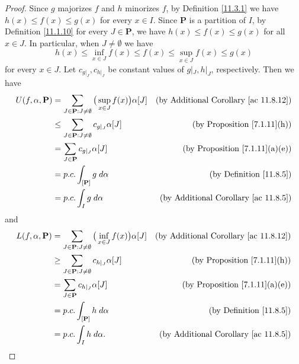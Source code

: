 \begin{proof}
    Since \(g\) majorizes \(f\) and \(h\) minorizes \(f\), by Definition \ref{11.3.1} we have \(h(x) \leq f(x) \leq g(x)\) for every \(x \in I\).
    Since \(\mathbf{P}\) is a partition of \(I\), by Definition \ref{11.1.10} for every \(J \in \mathbf{P}\), we have \(h(x) \leq f(x) \leq g(x)\) for all \(x \in J\).
    In particular, when \(J \neq \emptyset\) we have
    \[
        h(x) \leq \inf_{x \in J} f(x) \leq f(x) \leq \sup_{x \in J} f(x) \leq g(x)
    \]
    for every \(x \in J\).
    Let \(c_{g|_J}, c_{h|_J}\) be constant values of \(g|_J, h|_J\), respectively.
    Then we have
    \begin{align*}
        U(f, \alpha, \mathbf{P}) & = \sum_{J \in \mathbf{P} : J \neq \emptyset} \big(\sup_{x \in J} f(x)\big) \alpha[J] & \text{(by Additional Corollary \ref{ac 11.8.12})} \\
                                 & \leq \sum_{J \in \mathbf{P} : J \neq \emptyset} c_{g|_J} \alpha[J]                   & \text{(by Proposition \ref{7.1.11}(h))}           \\
                                 & = \sum_{J \in \mathbf{P}} c_{g|_J} \alpha[J]                                         & \text{(by Proposition \ref{7.1.11}(a)(e))}        \\
                                 & = p.c. \int_{[\mathbf{P}]} g \; d \alpha                                             & \text{(by Definition \ref{11.8.5})}               \\
                                 & = p.c. \int_I g \; d \alpha                                                          & \text{(by Additional Corollary \ref{ac 11.8.5})}
    \end{align*}
    and
    \begin{align*}
        L(f, \alpha, \mathbf{P}) & = \sum_{J \in \mathbf{P} : J \neq \emptyset} \big(\inf_{x \in J} f(x)\big) \alpha[J] & \text{(by Additional Corollary \ref{ac 11.8.12})} \\
                                 & \geq \sum_{J \in \mathbf{P} : J \neq \emptyset} c_{h|_J} \alpha[J]                   & \text{(by Proposition \ref{7.1.11}(h))}           \\
                                 & = \sum_{J \in \mathbf{P}} c_{h|_J} \alpha[J]                                         & \text{(by Proposition \ref{7.1.11}(a)(e))}        \\
                                 & = p.c. \int_{[\mathbf{P}]} h \; d \alpha                                             & \text{(by Definition \ref{11.8.5})}               \\
                                 & = p.c. \int_I h \; d \alpha.                                                         & \text{(by Additional Corollary \ref{ac 11.8.5})}
    \end{align*}
\end{proof}

